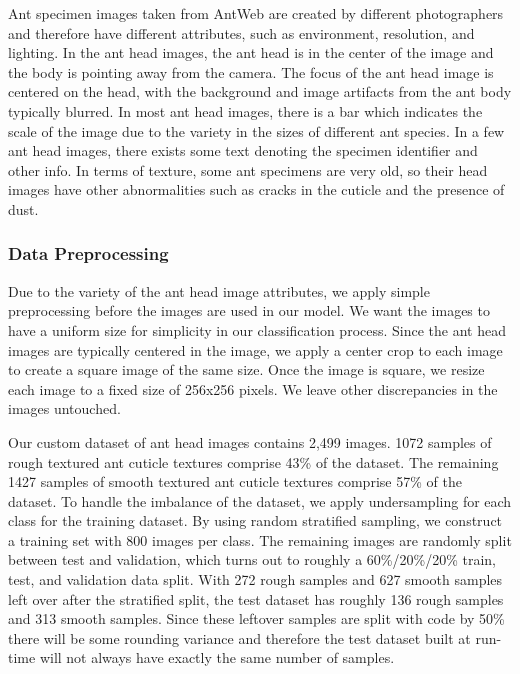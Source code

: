 \documentclass[12pt]{article}
\begin{document}
Ant specimen images taken from AntWeb \cite{perrichot_antweb_2012} are created
by different photographers and therefore have different attributes, such as
environment, resolution, and lighting. In the ant head images, the ant head is
in the center of the image and the body is pointing away from the camera. The
focus of the ant head image is centered on the head, with the background and
image artifacts from the ant body typically blurred. In most ant head images,
there is a bar which indicates the scale of the image due to the variety in the
sizes of different ant species. In a few ant head images, there exists some text
denoting the specimen identifier and other info. In terms of texture, some ant
specimens are very old, so their head images have other abnormalities such as
cracks in the cuticle and the presence of dust.

\subsubsection{Data Preprocessing}

Due to the variety of the ant head image attributes, we apply simple
preprocessing before the images are used in our model. We want the images to
have a uniform size for simplicity in our classification process. Since the ant
head images are typically centered in the image, we apply a center crop to each
image to create a square image of the same size. Once the image is square, we
resize each image to a fixed size of 256x256 pixels. We leave other
discrepancies in the images untouched.

Our custom dataset of ant head images contains 2,499 images. 1072 samples of
rough textured ant cuticle textures comprise 43\% of the dataset. The remaining
1427 samples of smooth textured ant cuticle textures comprise 57\% of the
dataset. To handle the imbalance of the dataset, we apply undersampling for each
class for the training dataset. By using random stratified sampling, we
construct a training set with 800 images per class. The remaining images are
randomly split between test and validation, which turns out to roughly a
60\%/20\%/20\% train, test, and validation data split. With 272 rough samples
and 627 smooth samples left over after the stratified split, the test dataset
has roughly 136 rough samples and 313 smooth samples. Since these leftover
samples are split with code by 50\% there will be some rounding variance and
therefore the test dataset built at run-time will not always have exactly the
same number of samples.
\end{document}
